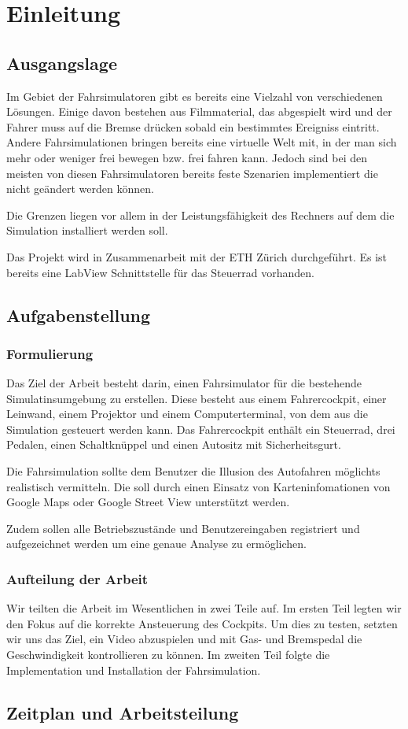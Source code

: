 \section{Einleitung}
\subsection{Ausgangslage}

Im Gebiet der Fahrsimulatoren gibt es bereits eine Vielzahl von verschiedenen Lösungen. Einige davon bestehen aus Filmmaterial, das abgespielt wird und der Fahrer muss auf die Bremse drücken sobald ein bestimmtes Ereigniss eintritt. Andere Fahrsimulationen bringen bereits eine virtuelle Welt mit, in der man sich mehr oder weniger frei bewegen bzw. frei fahren kann. Jedoch sind bei den meisten von diesen Fahrsimulatoren bereits feste Szenarien implementiert die  nicht geändert werden können.

Die Grenzen liegen vor allem in der Leistungsfähigkeit des Rechners auf dem die Simulation installiert werden soll.

Das Projekt wird in Zusammenarbeit mit der ETH Zürich durchgeführt. Es ist bereits eine LabView Schnittstelle für das Steuerrad vorhanden.


\subsection{Aufgabenstellung}
\subsubsection{Formulierung}

Das Ziel der Arbeit besteht darin, einen Fahrsimulator für die bestehende Simulatinsumgebung zu erstellen. Diese besteht aus einem Fahrercockpit, einer Leinwand, einem Projektor und einem Computerterminal, von dem aus die Simulation gesteuert werden kann. Das Fahrercockpit enthält ein Steuerrad, drei Pedalen, einen Schaltknüppel und einen Autositz mit Sicherheitsgurt.

Die Fahrsimulation sollte dem Benutzer die Illusion des Autofahren möglichts realistisch vermitteln. Die soll durch einen Einsatz von Karteninfomationen von Google Maps oder Google Street View unterstützt werden. 

Zudem sollen alle Betriebszustände und Benutzereingaben registriert und aufgezeichnet werden um eine genaue Analyse zu ermöglichen. 


\subsubsection{Aufteilung der Arbeit}
Wir teilten die Arbeit im Wesentlichen in zwei Teile auf. Im ersten Teil legten wir den Fokus auf die korrekte Ansteuerung des Cockpits. Um dies zu testen, setzten wir uns das Ziel, ein Video abzuspielen und mit Gas- und Bremspedal die Geschwindigkeit kontrollieren zu können. Im zweiten Teil folgte die Implementation und Installation der Fahrsimulation.

\subsection{Zeitplan und Arbeitsteilung}